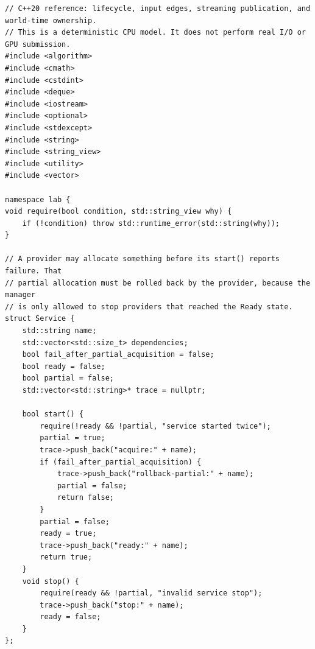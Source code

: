 \begin{verbatim}
// C++20 reference: lifecycle, input edges, streaming publication, and world-time ownership.
// This is a deterministic CPU model. It does not perform real I/O or GPU submission.
#include <algorithm>
#include <cmath>
#include <cstdint>
#include <deque>
#include <iostream>
#include <optional>
#include <stdexcept>
#include <string>
#include <string_view>
#include <utility>
#include <vector>

namespace lab {
void require(bool condition, std::string_view why) {
    if (!condition) throw std::runtime_error(std::string(why));
}

// A provider may allocate something before its start() reports failure. That
// partial allocation must be rolled back by the provider, because the manager
// is only allowed to stop providers that reached the Ready state.
struct Service {
    std::string name;
    std::vector<std::size_t> dependencies;
    bool fail_after_partial_acquisition = false;
    bool ready = false;
    bool partial = false;
    std::vector<std::string>* trace = nullptr;

    bool start() {
        require(!ready && !partial, "service started twice");
        partial = true;
        trace->push_back("acquire:" + name);
        if (fail_after_partial_acquisition) {
            trace->push_back("rollback-partial:" + name);
            partial = false;
            return false;
        }
        partial = false;
        ready = true;
        trace->push_back("ready:" + name);
        return true;
    }
    void stop() {
        require(ready && !partial, "invalid service stop");
        trace->push_back("stop:" + name);
        ready = false;
    }
};


\end{verbatim}
